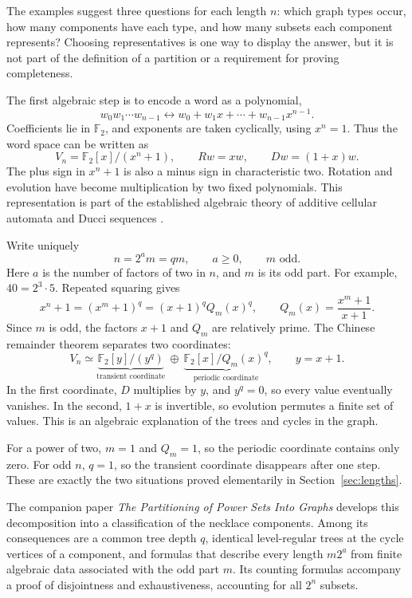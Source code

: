 \documentclass[11pt]{article}
\theoremstyle{definition}
\newcommand{\F}{\mathbb F_2}
\numberwithin{equation}{section}
\begin{document}
The examples suggest three questions for each length $n$:
which graph types occur, how many components have each type, and how
many subsets each component represents? Choosing representatives is
one way to display the answer, but it is not part of the definition
of a partition or a requirement for proving completeness.

The first algebraic step is to encode a word as a polynomial,
\[
 w_0w_1\cdots w_{n-1}
 \longleftrightarrow w_0+w_1x+\cdots+w_{n-1}x^{n-1}.
\]
Coefficients lie in $\F$, and exponents are taken cyclically, using
$x^n=1$. Thus the word space can be written as
\begin{equation}\label{eq:polynomial-space}
 V_n=\F[x]/(x^n+1),\qquad Rw=xw,\qquad Dw=(1+x)w.
\end{equation}
The plus sign in $x^n+1$ is also a minus sign in characteristic two.
Rotation and evolution have become multiplication by two fixed
polynomials. This representation is part of the established algebraic
theory of additive cellular automata and Ducci sequences
\cite{MartinOdlyzkoWolfram,MisiurewiczStevensThomas}.

Write uniquely
\begin{equation}\label{eq:odd-part}
 n=2^a m=qm,\qquad a\ge0,\qquad m\text{ odd}.
\end{equation}
Here $a$ is the number of factors of two in $n$, and $m$ is its odd
part. For example, $40=2^3\cdot5$. Repeated squaring gives
\begin{equation}\label{eq:factorization}
 x^n+1=(x^m+1)^q=(x+1)^q Q_m(x)^q,
 \qquad Q_m(x)=\frac{x^m+1}{x+1}.
\end{equation}
Since $m$ is odd, the factors $x+1$ and $Q_m$ are relatively prime.
The Chinese remainder theorem separates two coordinates:
\[
 V_n\simeq
 \underbrace{\F[y]/(y^q)}_{\text{transient coordinate}}
 \ \oplus\
 \underbrace{\F[x]/Q_m(x)^q}_{\text{periodic coordinate}},
 \qquad y=x+1.
\]
In the first coordinate, $D$ multiplies by $y$, and $y^q=0$, so every
value eventually vanishes. In the second, $1+x$ is invertible, so
evolution permutes a finite set of values. This is an algebraic
explanation of the trees and cycles in the graph.

For a power of two, $m=1$ and $Q_m=1$, so the periodic coordinate
contains only zero. For odd $n$, $q=1$, so the transient coordinate
disappears after one step. These are exactly the two situations
proved elementarily in Section~\ref{sec:lengths}.

The companion paper \emph{The Partitioning of Power Sets Into Graphs}
develops this decomposition into a classification of the necklace
components. Among its consequences are a common tree depth $q$,
identical level-regular trees at the cycle vertices of a component,
and formulas that describe every length $m2^a$ from finite algebraic
data associated with the odd part $m$. Its counting formulas accompany
a proof of disjointness and exhaustiveness, accounting for all $2^n$
subsets.
\end{document}
